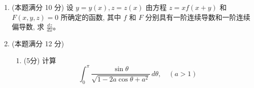 \begin{enumerate}
{\begin{enumerate}
		\item
		$-\frac14$。记 $A=\sqrt{1+x}+\sqrt{1-x}$。连续两次有理化可得
		\begin{align*}
		A-2
		&=\frac{A^2-4}{A+2}
		=\frac{2\bigl(\sqrt{1-x^2}-1\bigr)}{A+2}\\
		&=-\frac{2x^2}
		{(A+2)\bigl(\sqrt{1-x^2}+1\bigr)}.
		\end{align*}
		所以
		\[
		\lim_{x\to0}\frac{A-2}{x^2}
		=-\frac{2}{(2+2)(1+1)}
		=-\frac14 .
		\]

		\item
		$y=e^{-x/2}\left(C_1\cos\frac{\sqrt3x}{2}+C_2\sin\frac{\sqrt3x}{2}\right)$。
		特征方程为
		\[
		r^2+r+1=0,\qquad
		r_{1,2}=-\frac12\pm\frac{\sqrt3}{2}i ,
		\]
		是一对共轭复根 $\alpha\pm\beta i$（$\alpha=-\frac12$，$\beta=\frac{\sqrt3}{2}$），
		故实通解如上。

		\item
		$\dfrac{z^3f_1}{x\left(z^2f_1-xyf_2\right)}$。令
		\[
		u=\frac zx,\qquad v=\frac yz,
		\]
		并记 $f_1=f_u(u,v)$、$f_2=f_v(u,v)$。求
		$\partial z/\partial x$ 时把 $y$ 看作常量。对
		$f(u,v)=0$ 关于 $x$ 求偏导：
		\[
		f_1\left(\frac{z_x}{x}-\frac{z}{x^2}\right)
		+f_2\left(-\frac{y z_x}{z^2}\right)=0.
		\]
		整理为
		\[
		\left(\frac{f_1}{x}-\frac{yf_2}{z^2}\right)z_x
		=\frac{zf_1}{x^2},
		\]
		在分母不为零的条件下，
		\[
		\frac{\partial z}{\partial x}
		=\frac{z^3f_1}{x\left(z^2f_1-xyf_2\right)} .
		\]
	\end{enumerate}
}




\item 
(本题满分 10 分)
设 $y=y(x), z=z(x)$ 由方程 $z=x f(x+y)$ 和 $F(x, y, z)=0$ 所确定的函数, 其中 $f$ 和 $F$ 分别具有一阶连续导数和一阶连续偏导数, 求 $\frac{d z}{d x}$。





\item 
(本题满分 12 分)
\begin{enumerate}
	\item
(5分)
计算
	\[
	\int_{0}^{\pi} \frac{\sin \theta}{\sqrt{1-2 a \cos \theta+a^{2}}}\,d\theta,\quad(a>1)
	\]
	

\end{enumerate}
\end{enumerate}
